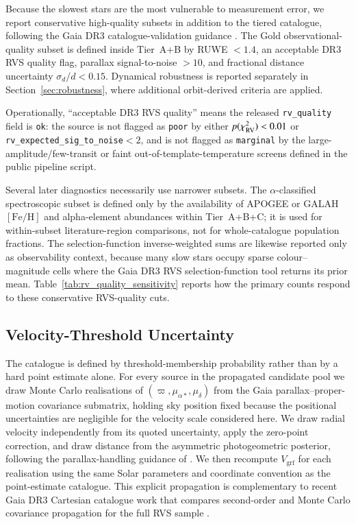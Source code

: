 \documentclass{aa}  %
\newcommand{\vgrf}{\ensuremath{V_{\mathrm{grf}}}\xspace}
\newcommand{\FeH}{\ensuremath{[\mathrm{Fe}/\mathrm{H}]}}
\begin{document}
Because the slowest stars are the most vulnerable to measurement error,
we report conservative high-quality subsets in addition to the tiered
catalogue, following the Gaia DR3 catalogue-validation guidance
\citep{Babusiaux2023}.  The Gold observational-quality subset is defined
inside Tier~A+B by
RUWE $<1.4$, an acceptable DR3 RVS quality flag, parallax
signal-to-noise $>10$, and fractional distance uncertainty
$\sigma_d/d<0.15$.  Dynamical robustness is reported separately in
Section~\ref{sec:robustness}, where additional orbit-derived criteria
are applied.

Operationally, ``acceptable DR3 RVS quality'' means the released
\texttt{rv\_quality} field is \texttt{ok}: the source is not flagged as
\texttt{poor} by either $p(\chi^2_{\rm RV})<0.01$ or
\texttt{rv\_expected\_sig\_to\_noise}$<2$, and is not flagged as
\texttt{marginal} by the large-amplitude/few-transit or faint
out-of-template-temperature screens defined in the public pipeline script.

Several later diagnostics necessarily use narrower subsets.  The
$\alpha$-classified spectroscopic subset is defined only by the
availability of APOGEE or GALAH \FeH{} and alpha-element abundances
within Tier~A+B+C; it is used for within-subset literature-region
comparisons, not for whole-catalogue population fractions.  The
selection-function inverse-weighted sums are likewise reported only as
observability context, because many slow stars occupy sparse
colour--magnitude cells where the Gaia DR3 RVS selection-function tool
returns its prior mean.  Table~\ref{tab:rv_quality_sensitivity} reports
how the primary counts respond to these conservative RVS-quality cuts.



\subsection{Velocity-Threshold Uncertainty} \label{sec:vgrf_mc}

The catalogue is defined by threshold-membership probability rather than
by a hard point estimate alone.  For every source in the propagated
candidate pool we draw Monte Carlo realisations of
$(\varpi,\mu_{\alpha *},\mu_\delta)$ from the Gaia parallax--proper-motion
covariance submatrix, holding sky position fixed because the positional
uncertainties are negligible for the velocity scale considered here.
We draw radial velocity independently from its quoted uncertainty, apply
the \citet{Lindegren2021} zero-point correction, and draw distance from
the asymmetric \citet{BailerJones2021} photogeometric posterior,
following the parallax-handling guidance of \citet{Luri2018}.  We then
recompute $\vgrf$ for each realisation using the same Solar parameters
and coordinate convention as the point-estimate catalogue.  This
explicit propagation is complementary to recent Gaia DR3 Cartesian
catalogue work that compares second-order and Monte Carlo covariance
propagation for the full RVS sample \citep{Zhang2025}.
\end{document}
